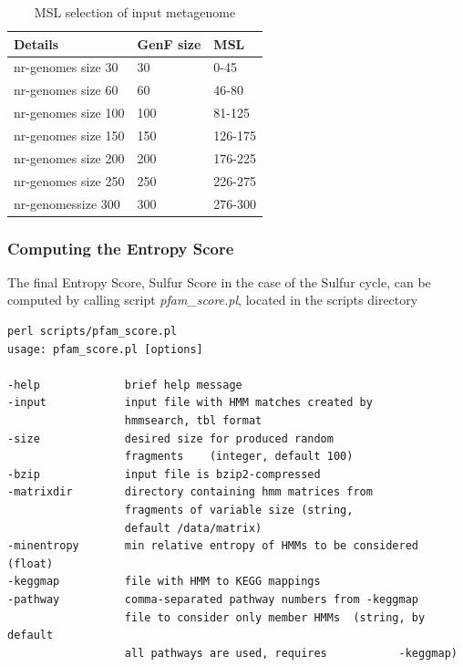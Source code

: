 \documentclass[12pt]{report}
\begin{document}
\begin{table}[H]
\centering
\caption{MSL selection of input metagenome}
\label{MSL-input}
\begin{tabular}{@{}lll@{}}
\toprule
Details             & GenF size & MSL     \\ \midrule
nr-genomes size 30  & 30        & 0-45    \\
nr-genomes size 60  & 60        & 46-80   \\
nr-genomes size 100 & 100       & 81-125  \\
nr-genomes size 150 & 150       & 126-175 \\
nr-genomes size 200 & 200       & 176-225 \\
nr-genomes size 250 & 250       & 226-275 \\
nr-genomessize 300  & 300       & 276-300 \\ \bottomrule
\end{tabular}
\end{table}


\subsubsection{Computing the Entropy Score}
\label{entropy_score}

The final Entropy Score, Sulfur Score in the case of the Sulfur cycle, can be computed by calling script \textit{pfam\_score.pl}, located in the scripts directory
\begin{verbatim}
perl scripts/pfam_score.pl
usage: pfam_score.pl [options] 

-help             brief help message
-input            input file with HMM matches created by 
                  hmmsearch, tbl format
-size             desired size for produced random 
                  fragments    (integer, default 100)
-bzip             input file is bzip2-compressed
-matrixdir        directory containing hmm matrices from 
                  fragments of variable size (string, 
                  default /data/matrix)
-minentropy       min relative entropy of HMMs to be considered (float)
-keggmap          file with HMM to KEGG mappings
-pathway          comma-separated pathway numbers from -keggmap 
                  file to consider only member HMMs  (string, by default 
                  all pathways are used, requires           -keggmap)
\end{verbatim}
\end{document}
